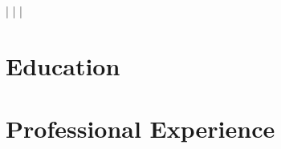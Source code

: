 \documentclass[a4paper,11pt]{article}
\begin{document}
    \begin{center}
        \myName
        \myAddress
        \myWebsite | \myMailAddress | \myGithub | \myPhoneNumber 
    \end{center}

    \section{Education}
        \begin{itemize}
            \postdoc
                \cvItemizeBegin
                    \postdocOne
                    \postdocTwo
                \cvItemizeEnd
            \phd
                \cvItemizeBegin
                    \phdOne
                    \phdTwo
                \cvItemizeEnd
            \msc
                \cvItemizeBegin
                    \mscOne
                    \mscTwo
                    \mscThree
                \cvItemizeEnd
            \erasmus
                \cvItemizeBegin
                    \erasmusOne
                \cvItemizeEnd
            \bsc
                \cvItemizeBegin
                    \bscOne
                \cvItemizeEnd
        \end{itemize}

    \section{Professional Experience}
        \begin{itemize}
            \expFlowers
                \cvItemizeBegin
                    \expFlowersOne
                    \expFlowersTwo
                \cvItemizeEnd
            \expTum
                \cvItemizeBegin
                    \expTumOne
                    \expTumTwo
                \cvItemizeEnd
            \expInfineon
                \cvItemizeBegin
                    \expInfineonOne
                    \expInfineonTwo
                \cvItemizeEnd
            \expBmw
                \cvItemizeBegin
                    \expBmwOne
                    \expBmwTwo
                \cvItemizeEnd
            \expEgnition
                \expEgnitionDriverless
                \expEgnitionBusinessPlan    
                \expEgnitionTeamLeader
                \expEgnitionAerodynamics
            \expSlive
                \cvItemizeBegin
                    \expSliveOne
                    \expSliveTwo
                \cvItemizeEnd
            \expTuhh
                \cvItemizeBegin
                    \expTuhhOne
                    \expSliveTwo
                \cvItemizeEnd
        \end{itemize}
\end{document}
